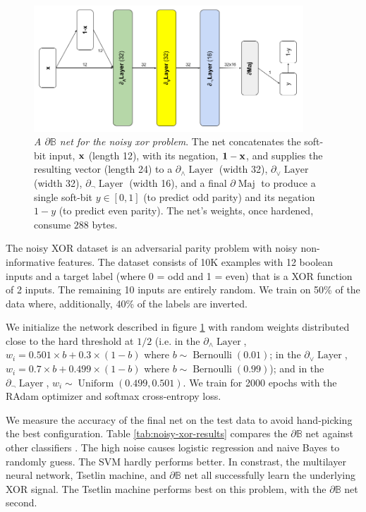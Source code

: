 \documentclass{article} %
\begin{document}
\begin{figure}[t!]
	\centering
	\includegraphics[width=0.9\textwidth]{noisy-xor-architecture.png}
	\caption{{\em A $\partial\mathbb{B}$ net for the noisy xor problem}. The net concatenates the soft-bit input, ${\bf x}$ (length 12), with its negation, ${\bf 1 - x}$, and supplies the resulting vector (length 24) to a $\partial_{\wedge}\!\!\operatorname{Layer}$ (width 32), $\partial_{\vee}\!\!\operatorname{Layer}$ (width 32),  $\partial_{\neg} \!\operatorname{Layer}$ (width 16), and a final $\partial\!\operatorname{Maj}$ to produce a single soft-bit $y \in [0,1]$ (to predict odd parity) and its negation $1-y$ (to predict even parity). The net's weights, once hardened, consume $288$ bytes.}
	\label{fig:noisy-xor-architecture}
\end{figure}

The noisy XOR dataset \citep{noisy-xor-dataset} is an adversarial parity problem with noisy non-informative features. The dataset consists of 10K examples with 12 boolean inputs and a target label (where 0 = odd and 1 = even) that is a XOR function of 2 inputs. The remaining 10 inputs are entirely random. We train on 50\% of the data where, additionally, 40\% of the labels are inverted.

We initialize the network described in figure \ref{fig:noisy-xor-architecture} with random weights distributed close to the hard threshold at $1/2$ (i.e. in the $\partial_{\wedge}\!\operatorname{Layer}$, $w_{i} = 0.501 \times b + 0.3 \times (1-b)$ where $b \sim \operatorname{Bernoulli}(0.01)$; in the $\partial_{\vee}\!\operatorname{Layer}$, $w_{i} = 0.7 \times b + 0.499 \times (1-b)$ where $b \sim \operatorname{Bernoulli}(0.99)$); and in the $\partial_{\neg}\!\operatorname{Layer}$, $w_{i} \sim \operatorname{Uniform}(0.499, 0.501)$. We train for 2000 epochs with the RAdam optimizer and softmax cross-entropy loss. 

We measure the accuracy of the final net on the test data to avoid hand-picking the best configuration. Table \ref{tab:noisy-xor-results} compares the $\partial\mathbb{B}$ net against other classifiers \citep{granmo18}. The high noise causes logistic regression and naive Bayes to randomly guess. The SVM hardly performs better. In constrast, the multilayer neural network, Tsetlin machine, and  $\partial\mathbb{B}$ net all successfully learn the underlying XOR signal. The Tsetlin machine performs best on this problem, with the $\partial\mathbb{B}$ net second.
\end{document}
